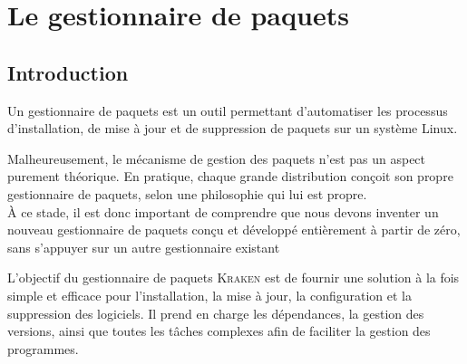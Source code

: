 \chapter{Le gestionnaire de paquets }
\minitoc
\clearpage

\label{sec:kraken-pkg}
\section{Introduction}
Un gestionnaire de paquets est un outil  permettant d’automatiser les processus d’installation, de mise à jour et de suppression de paquets sur un système Linux. 

Malheureusement, le mécanisme de gestion des paquets n’est pas un aspect purement théorique. En pratique, chaque grande distribution conçoit son propre gestionnaire de paquets, selon une philosophie qui lui est propre.\\
À ce stade, il est donc important de comprendre que nous devons inventer un nouveau gestionnaire de paquets conçu et développé entièrement à partir de zéro, sans s’appuyer sur
un autre gestionnaire existant

L’objectif du gestionnaire de paquets \textsc{Kraken} est de fournir une solution à la fois simple et efficace pour l’installation, la mise à jour, la configuration et la suppression des logiciels. Il prend en charge les dépendances, la gestion des versions, ainsi que toutes les tâches complexes afin de faciliter la gestion des programmes.







